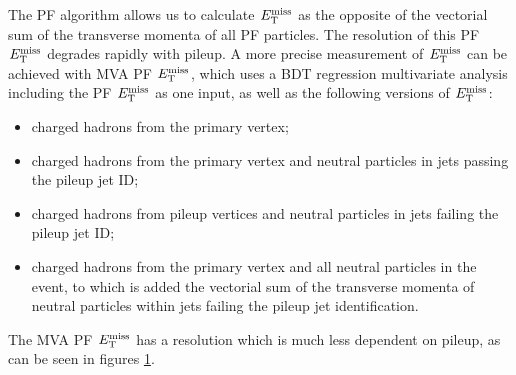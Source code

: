 The \ac{PF} algorithm allows us to calculate $E_{\mathrm{T}}^{\text{miss}}$ as the opposite of the vectorial sum
of the transverse momenta of all PF particles. The resolution of this PF
$E_{\mathrm{T}}^{\text{miss}}$ degrades rapidly with pileup. A more precise
measurement of $E_{\mathrm{T}}^{\text{miss}}$ can be achieved with MVA PF
$E_{\mathrm{T}}^{\text{miss}}$, which uses a BDT regression multivariate analysis
including the PF $E_{\mathrm{T}}^{\text{miss}}$ as one input, as well as the following
versions of $E_{\mathrm{T}}^{\text{miss}}$:
\begin{itemize}
\item charged hadrons from the primary vertex;
\item charged hadrons from the primary vertex and neutral particles in jets
passing the pileup jet ID;
\item charged hadrons from pileup vertices and neutral particles in jets failing
the pileup jet ID;
\item charged hadrons from the primary vertex and all neutral particles in the
event, to which is added the vectorial sum of the transverse momenta of neutral
particles within jets failing the pileup jet identification.
\end{itemize}

The MVA PF $E_{\mathrm{T}}^{\text{miss}}$ has a resolution which is much less
dependent on pileup, as can be seen in figures \ref{fig:mvamet}.

\begin{figure}
\begin{center}
\end{center}
\caption{
}
\label{fig:mvamet}
\end{figure}

